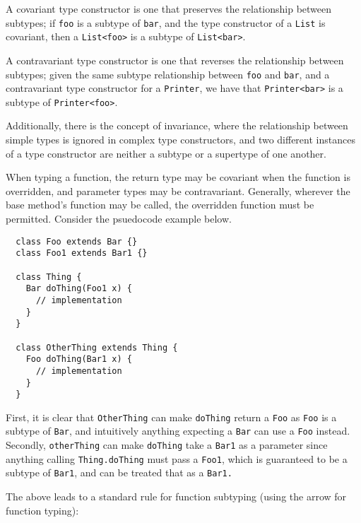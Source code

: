 A covariant type constructor is one that preserves the relationship between subtypes; if \texttt{foo} is a subtype of \texttt{bar}, and the type constructor of a \texttt{List} is covariant, then a \texttt{List<foo>} is a subtype of \texttt{List<bar>}.

A contravariant type constructor is one that reverses the relationship between subtypes; given the same subtype relationship between \texttt{foo} and \texttt{bar}, and a contravariant type constructor for a \texttt{Printer}, we have that \texttt{Printer<bar>} is a subtype of \texttt{Printer<foo>}.

Additionally, there is the concept of invariance, where the relationship between simple types is ignored in complex type constructors, and two different instances of a type constructor are neither a subtype or a supertype of one another.

When typing a function, the return type may be covariant when the function is overridden, and parameter types may be contravariant. Generally, wherever the base method's function may be called, the overridden function must be permitted.
Consider the psuedocode example below.

\begin{verbatim}
  class Foo extends Bar {}
  class Foo1 extends Bar1 {}

  class Thing {
    Bar doThing(Foo1 x) { 
      // implementation
    }
  }

  class OtherThing extends Thing {
    Foo doThing(Bar1 x) {
      // implementation
    }
  }
\end{verbatim}
First, it is clear that \texttt{OtherThing} can make \texttt{doThing} return a \texttt{Foo} as \texttt{Foo} is a subtype of \texttt{Bar}, and intuitively anything expecting a \texttt{Bar} can use a \texttt{Foo} instead. Secondly, \texttt{otherThing} can make \texttt{doThing} take a \texttt{Bar1} as a parameter since anything calling \texttt{Thing.doThing} must pass a \texttt{Foo1}, which is guaranteed to be a subtype of \texttt{Bar1}, and can be treated that as a \texttt{Bar1.}

The above leads to a standard rule for function subtyping (using the arrow for function typing):

\begin{mathpar}
\end{mathpar}


